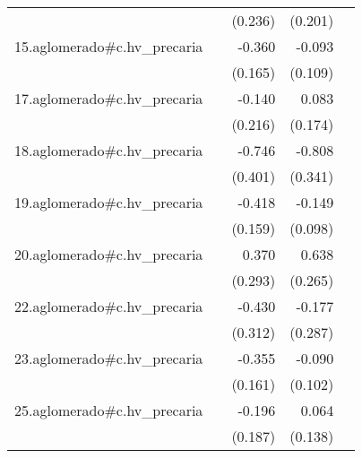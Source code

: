 {\begin{longtable}{l*{4}{D{.}{.}{-1}}}
            &                     &     (0.236)         &     (0.201)         &                     \\
\addlinespace
15.aglomerado#c.hv\_precaria&                     &      -0.360\sym{*}  &      -0.093         &                     \\
            &                     &     (0.165)         &     (0.109)         &                     \\
\addlinespace
17.aglomerado#c.hv\_precaria&                     &      -0.140         &       0.083         &                     \\
            &                     &     (0.216)         &     (0.174)         &                     \\
\addlinespace
18.aglomerado#c.hv\_precaria&                     &      -0.746         &      -0.808\sym{*}  &                     \\
            &                     &     (0.401)         &     (0.341)         &                     \\
\addlinespace
19.aglomerado#c.hv\_precaria&                     &      -0.418\sym{**} &      -0.149         &                     \\
            &                     &     (0.159)         &     (0.098)         &                     \\
\addlinespace
20.aglomerado#c.hv\_precaria&                     &       0.370         &       0.638\sym{*}  &                     \\
            &                     &     (0.293)         &     (0.265)         &                     \\
\addlinespace
22.aglomerado#c.hv\_precaria&                     &      -0.430         &      -0.177         &                     \\
            &                     &     (0.312)         &     (0.287)         &                     \\
\addlinespace
23.aglomerado#c.hv\_precaria&                     &      -0.355\sym{*}  &      -0.090         &                     \\
            &                     &     (0.161)         &     (0.102)         &                     \\
\addlinespace
25.aglomerado#c.hv\_precaria&                     &      -0.196         &       0.064         &                     \\
            &                     &     (0.187)         &     (0.138)         &                     \\

\end{longtable}}
